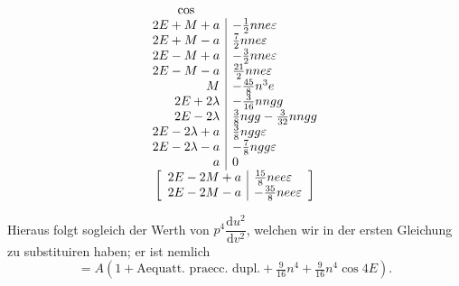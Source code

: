 \[
\begin{array}{r|l}
\multicolumn{1}{c}{\cos}&\\
2E+M+a&-\tfrac12nne\varepsilon\\
2E+M-a&\tfrac72nne\varepsilon\\
2E-M+a&-\tfrac32nne\varepsilon\\
2E-M-a&\tfrac{21}{2}nne\varepsilon\\
M&-\tfrac{45}{8}n^3e\\
2E+2\lambda&-\tfrac{3}{16}nngg\\
2E-2\lambda&\tfrac38ngg-\tfrac{3}{32}nngg\\
2E-2\lambda+a&\tfrac38ngg\varepsilon\\
2E-2\lambda-a&-\tfrac78ngg\varepsilon\\
a&0\\
\multicolumn{2}{c}{\left[\begin{array}{r|l}
2E-2M+a&\tfrac{15}{8}nee\varepsilon\\
2E-2M-a&-\tfrac{35}{8}nee\varepsilon
\end{array}\right]}
\end{array}
\]
\par\noindent\hspace*{\parindent}Hieraus folgt sogleich der Werth von \(p^4\dfrac{\mathrm du^2}{\mathrm dv^2}\), welchen wir in der ersten
Gleichung zu substituiren haben; er ist nemlich
\[
=A(1+\text{Aequatt. praecc. dupl.}+\tfrac{9}{16}n^4+\tfrac{9}{16}n^4\cos4E).
\]
\clearpage
\endgroup
